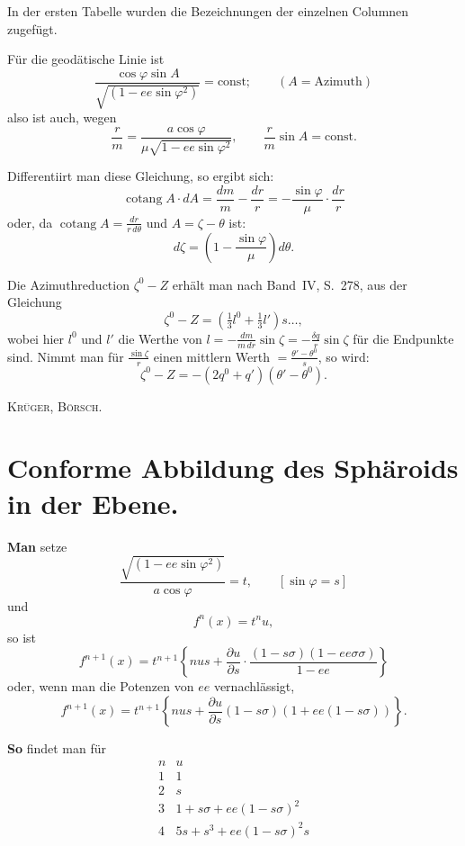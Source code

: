 \documentclass[12pt,a4paper]{article}
\theoremstyle{plain}
\theoremstyle{definition}
\theoremstyle{remark}
\newcommand{\cotang}{\operatorname{cotang}}
\newcommand{\ee}{\mathit{ee}}
\begin{document}
In der ersten Tabelle wurden die Bezeichnungen der einzelnen Columnen zugefügt.

Für die geodätische Linie ist
\[
\frac{\cos\varphi\sin A}{\sqrt{(1 - \ee\sin\varphi^2)}} = \text{const}; \qquad (A = \text{Azimuth})
\]
also ist auch, wegen
\[
\frac{r}{m} = \frac{a\cos\varphi}{\mu\sqrt{1 - \ee\sin\varphi^2}}, \qquad \frac{r}{m}\sin A = \text{const.}
\]

Differentiirt man diese Gleichung, so ergibt sich:
\[
\cotang A\cdot dA = \frac{dm}{m} - \frac{dr}{r} = -\frac{\sin\varphi}{\mu}\cdot\frac{dr}{r}
\]
oder, da $\cotang A = \frac{dr}{r\,d\theta}$ und $A = \zeta - \theta$ ist:
\[
d\zeta = \left(1 - \frac{\sin\varphi}{\mu}\right)d\theta.
\]

Die Azimuthreduction $\zeta^0 - Z$ erhält man nach Band~IV, S.~278, aus der Gleichung
\[
\zeta^0 - Z = (\tfrac{1}{3}l^0 + \tfrac{1}{3}l')s\ldots,
\]
wobei hier $l^0$ und $l'$ die Werthe von $l = -\frac{dm}{m\,dr}\sin\zeta = -\frac{\delta q}{r}\sin\zeta$ für die Endpunkte sind. Nimmt
man für $\frac{\sin\zeta}{r}$ einen mittlern Werth $= \frac{\theta' - \theta^0}{s}$, so wird:
\[
\zeta^0 - Z = -(2q^0 + q')(\theta' - \theta^0).
\]

\hfill \textsc{Krüger, Börsch.}

\newpage
\section*{Conforme Abbildung des Sphäroids in der Ebene.}

\textbf{Man} setze
\[
\frac{\sqrt{(1 - \ee\sin\varphi^2)}}{a\cos\varphi} = t, \qquad [\sin\varphi = s]
\]
und
\[
f^n(x) = t^n u,
\]
so ist
\[
f^{n+1}(x) = t^{n+1}\left\{nus + \frac{\partial u}{\partial s}\cdot\frac{(1 - s\sigma)(1 - \ee\sigma\sigma)}{1 - \ee}\right\}
\]
oder, wenn man die Potenzen von $\ee$ vernachlässigt,
\[
f^{n+1}(x) = t^{n+1}\left\{nus + \frac{\partial u}{\partial s}(1 - s\sigma)(1 + \ee(1 - s\sigma))\right\}.
\]

\textbf{So} findet man für
\[
\begin{array}{c|c}
n & u \\ \hline
1 & 1 \\
2 & s \\
3 & 1 + s\sigma + \ee(1 - s\sigma)^2 \\
4 & 5s + s^3 + \ee(1 - s\sigma)^2s
\end{array}
\]
\end{document}
